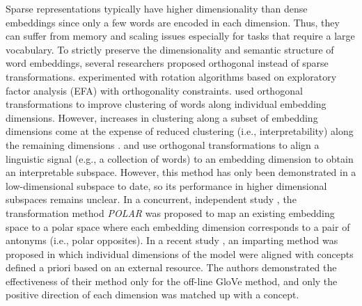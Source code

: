 \documentclass[11pt,a4paper]{article}
\begin{document}
Sparse representations typically have higher dimensionality
than dense embeddings since only a few words are encoded in each dimension. Thus, they can suffer from memory and scaling issues especially for tasks that require a large vocabulary. 
To strictly preserve the dimensionality and semantic
structure of word embeddings, several researchers proposed
orthogonal instead of sparse transformations.
\citet{park17rotated} experimented with rotation algorithms
based on exploratory factor analysis (EFA) with
orthogonality constraints. \citet{zobnin17rotations} used
orthogonal transformations  to improve clustering of words
along individual embedding dimensions. However, increases in
clustering along a subset of embedding dimensions come at
the expense of reduced clustering (i.e., interpretability)
along the remaining dimensions
\citep{zobnin17rotations}.
\citet{DBLP:conf/acl/RotheS16} and
\citet{dufter19ultraDense} use
orthogonal transformations to align a  linguistic
signal (e.g., a collection of words) to an embedding dimension  to obtain an interpretable subspace. However, this method has only been demonstrated in a low-dimensional subspace to date, so its performance in higher dimensional subspaces remains unclear. In a concurrent, independent study \citep{mathew20polar}, the transformation method \textit{POLAR} was proposed to map an existing embedding space to a polar space where each embedding dimension corresponds to a pair of antonyms (i.e., polar opposites).
In a recent study \citep{senel20impart}, an imparting method
was proposed in which individual dimensions of the model
were aligned with concepts defined a priori based on an
external resource.
The authors demonstrated the effectiveness of their method only for the off-line GloVe method, and only the positive direction of each dimension was matched up with a concept. 
\end{document}
